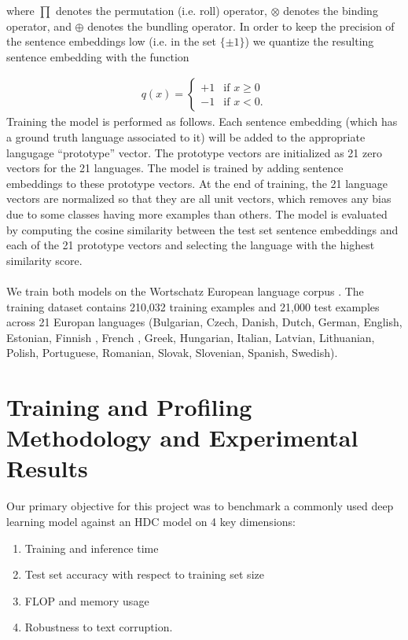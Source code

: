 \documentclass[conference]{IEEEtran}
\begin{document}
where $\prod$ denotes the permutation (i.e. roll) operator, $\otimes$ denotes the binding operator, and $\oplus$ denotes the bundling operator. In order to keep the precision of the sentence embeddings low (i.e. in the set $\{\pm 1\}$) we quantize the resulting sentence embedding with the function

\begin{align}
    q(x) = \begin{cases}
        +1 & \text{if } x \geq 0\\
        -1 & \text{if } x < 0.
    \end{cases}
\end{align}
Training the model is performed as follows. Each sentence embedding (which has a ground truth language associated to it) will be added to the appropriate langugage ``prototype'' vector. The prototype vectors are initialized as 21 zero vectors for the 21 languages. The model is trained by adding sentence embeddings to these prototype vectors. At the end of training, the 21 language vectors are normalized so that they are all unit vectors, which removes any bias due to some classes having more examples than others. The model is evaluated by computing the cosine similarity between the test set sentence embeddings and each of the 21 prototype vectors and selecting the language with the highest similarity score.\\
\\
We train both models on the Wortschatz European language corpus \cite{quasthoff-etal-2006-corpus}. The training dataset contains 210,032 training examples and 21,000 test examples across 21 Europan languages (Bulgarian, Czech, Danish, Dutch, German, English, Estonian,
 Finnish , French , Greek, Hungarian, Italian, Latvian,
Lithuanian, Polish, Portuguese, Romanian, Slovak, Slovenian,
Spanish, Swedish).

\section{Training and Profiling Methodology and Experimental Results}
Our primary objective for this project was to benchmark a commonly used deep learning model against an HDC model on 4 key dimensions:
\begin{enumerate}
    \item Training and inference time
    \item Test set accuracy with respect to training set size
    \item FLOP and memory usage
    \item Robustness to text corruption.
\end{enumerate}
\end{document}
